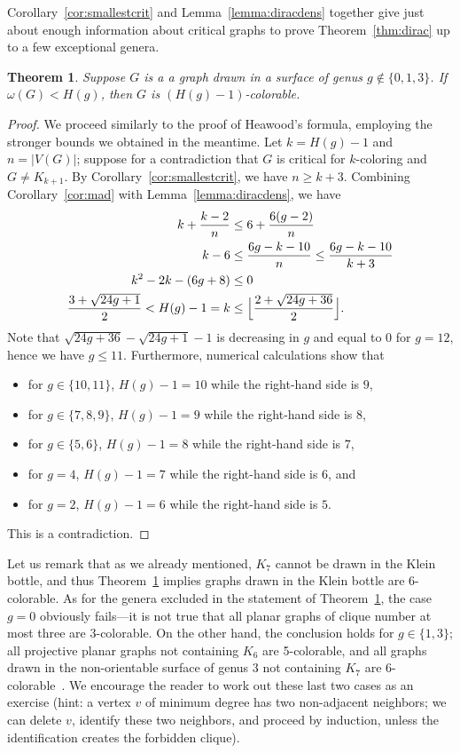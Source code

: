 \documentclass[12pt,twoside,openright,a4paper]{book}
\newtheorem{theorem}{Theorem}[chapter]
\begin{document}
Corollary~\ref{cor:smallestcrit} and Lemma~\ref{lemma:diracdens} together give just about enough information about critical graphs to prove
Theorem~\ref{thm:dirac} up to a few exceptional genera.
\begin{theorem}\label{thm:aldirac}
Suppose $G$ is a a graph drawn in a surface of genus $g\not\in\{0,1,3\}$.  If $\omega(G)<H(g)$, then $G$ is $(H(g)-1)$-colorable.
\end{theorem}
\begin{proof}
We proceed similarly to the proof of Heawood's formula, employing the stronger bounds we obtained in the meantime.
Let $k=H(g)-1$ and $n=|V(G)|$; suppose for a contradiction that $G$ is critical for $k$-coloring and $G\neq K_{k+1}$.
By Corollary~\ref{cor:smallestcrit}, we have $n\ge k+3$.  Combining Corollary~\ref{cor:mad} with Lemma~\ref{lemma:diracdens},
we have
\begin{align*}
k+\frac{k-2}{n}&\le 6+\frac{6(g-2)}{n}\\
k-6&\le\frac{6g-k-10}{n}\le \frac{6g-k-10}{k+3}\\
k^2-2k-(6g+8)&\le 0\\
\frac{3+\sqrt{24g+1}}{2}<H(g)-1=k&\le \Bigl\lfloor\frac{2+\sqrt{24g+36}}{2}\Bigr\rfloor.
\end{align*}
Note that $\sqrt{24g+36}-\sqrt{24g+1}-1$ is decreasing in $g$ and equal to $0$ for $g=12$, hence we have $g\le 11$.
Furthermore, numerical calculations show that
\begin{itemize}
\item for $g\in\{10,11\}$, $H(g)-1=10$ while the right-hand side is $9$,
\item for $g\in\{7,8,9\}$, $H(g)-1=9$ while the right-hand side is $8$,
\item for $g\in\{5,6\}$, $H(g)-1=8$ while the right-hand side is $7$,
\item for $g=4$, $H(g)-1=7$ while the right-hand side is $6$, and
\item for $g=2$, $H(g)-1=6$ while the right-hand side is $5$.
\end{itemize}
This is a contradiction.
\end{proof}
Let us remark that as we already mentioned, $K_7$ cannot be drawn in the Klein bottle, and thus Theorem~\ref{thm:aldirac} implies
graphs drawn in the Klein bottle are $6$-colorable.
As for the genera excluded in the statement of Theorem~\ref{thm:aldirac}, the case $g=0$ obviously fails---it is not true that
all planar graphs of clique number at most three are $3$-colorable.  On the other hand, the conclusion holds for $g\in\{1,3\}$;
all projective planar graphs not containing $K_6$ are 5-colorable, and all graphs drawn in the non-orientable surface of genus $3$
not containing $K_7$ are $6$-colorable~\cite{albertson1979three}.  We encourage the reader to work out these last two cases as an
exercise (hint: a vertex $v$ of minimum degree has two non-adjacent neighbors; we can delete $v$, identify these two neighbors,
and proceed by induction, unless the identification creates the forbidden clique).
\end{document}
